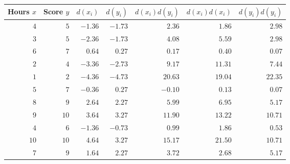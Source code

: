\begin{tabular}{rrrrrrr}                                                                        \toprule
Hours $x$ & Score $y$ & $d(x_i)$ & $d(y_i)$ & $d(x_i)d(y_i)$ & $d(x_i)d(x_i)$ & $d(y_i)d(y_i)$ \\\midrule
$4$       & $5$       & $-1.36$  & $-1.73$  & $2.36$        & $1.86$         & $2.98$         \\[4pt]
$3$       & $5$       & $-2.36$  & $-1.73$  & $4.08$        & $5.59$         & $2.98$         \\[4pt]
$6$       & $7$       & $0.64$   & $0.27$   & $0.17$        & $0.40$         & $0.07$         \\[4pt]
$2$       & $4$       & $-3.36$  & $-2.73$  & $9.17$        & $11.31$        & $7.44$         \\[4pt]
$1$       & $2$       & $-4.36$  & $-4.73$  & $20.63$       & $19.04$        & $22.35$        \\[4pt]
$5$       & $7$       & $-0.36$  & $0.27$   & $-0.10$       & $0.13$         & $0.07$         \\[4pt]
$8$       & $9$       & $2.64$   & $2.27$   & $5.99$        & $6.95$         & $5.17$         \\[4pt]
$9$       & $10$      & $3.64$   & $3.27$   & $11.90$       & $13.22$        & $10.71$        \\[4pt]
$4$       & $6$       & $-1.36$  & $-0.73$  & $0.99$        & $1.86$         & $0.53$         \\[4pt]
$10$      & $10$      & $4.64$   & $3.27$   & $15.17$       & $21.50$        & $10.71$        \\[4pt]
$7$       & $9$       & $1.64$   & $2.27$   & $3.72$        & $2.68$         & $5.17$         \\\bottomrule
\end{tabular}
